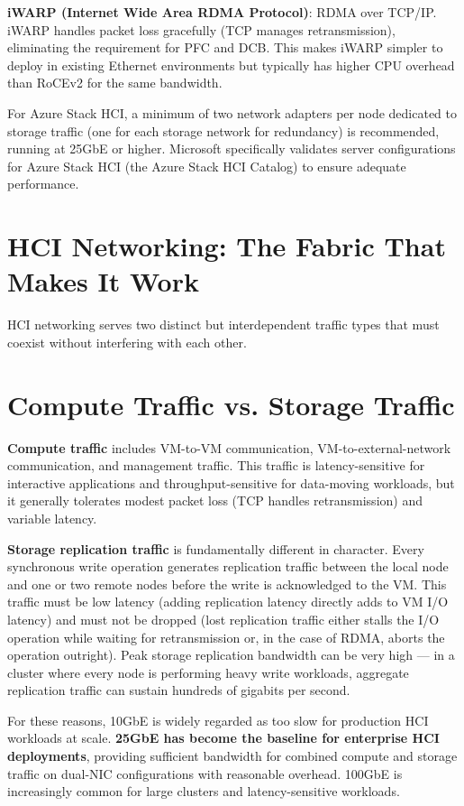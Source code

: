\textbf{iWARP (Internet Wide Area RDMA Protocol)}: RDMA over TCP/IP. iWARP handles packet loss gracefully (TCP manages retransmission), eliminating the requirement for PFC and DCB. This makes iWARP simpler to deploy in existing Ethernet environments but typically has higher CPU overhead than RoCEv2 for the same bandwidth.

For Azure Stack HCI, a minimum of two network adapters per node dedicated to storage traffic (one for each storage network for redundancy) is recommended, running at 25GbE or higher. Microsoft specifically validates server configurations for Azure Stack HCI (the Azure Stack HCI Catalog) to ensure adequate performance.

\section{HCI Networking: The Fabric That Makes It Work}
HCI networking serves two distinct but interdependent traffic types that must coexist without interfering with each other.

\section{Compute Traffic vs. Storage Traffic}
\textbf{Compute traffic} includes VM-to-VM communication, VM-to-external-network communication, and management traffic. This traffic is latency-sensitive for interactive applications and throughput-sensitive for data-moving workloads, but it generally tolerates modest packet loss (TCP handles retransmission) and variable latency.

\textbf{Storage replication traffic} is fundamentally different in character. Every synchronous write operation generates replication traffic between the local node and one or two remote nodes before the write is acknowledged to the VM. This traffic must be low latency (adding replication latency directly adds to VM I/O latency) and must not be dropped (lost replication traffic either stalls the I/O operation while waiting for retransmission or, in the case of RDMA, aborts the operation outright). Peak storage replication bandwidth can be very high --- in a cluster where every node is performing heavy write workloads, aggregate replication traffic can sustain hundreds of gigabits per second.

For these reasons, 10GbE is widely regarded as too slow for production HCI workloads at scale. \textbf{25GbE has become the baseline for enterprise HCI deployments}, providing sufficient bandwidth for combined compute and storage traffic on dual-NIC configurations with reasonable overhead. 100GbE is increasingly common for large clusters and latency-sensitive workloads.

